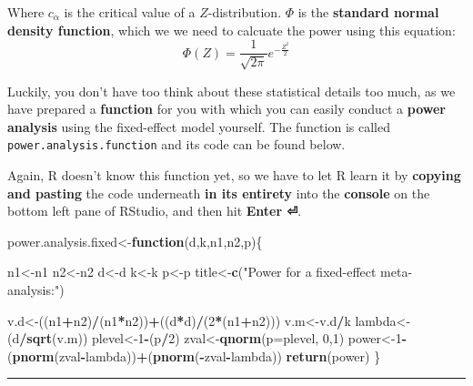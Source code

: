 \documentclass[]{book}
\newenvironment{Shaded}{\begin{snugshade}}{\end{snugshade}}
\newcommand{\ControlFlowTok}[1]{\textcolor[rgb]{0.13,0.29,0.53}{\textbf{#1}}}
\newcommand{\DataTypeTok}[1]{\textcolor[rgb]{0.13,0.29,0.53}{#1}}
\newcommand{\DecValTok}[1]{\textcolor[rgb]{0.00,0.00,0.81}{#1}}
\newcommand{\KeywordTok}[1]{\textcolor[rgb]{0.13,0.29,0.53}{\textbf{#1}}}
\newcommand{\NormalTok}[1]{#1}
\newcommand{\OperatorTok}[1]{\textcolor[rgb]{0.81,0.36,0.00}{\textbf{#1}}}
\newcommand{\StringTok}[1]{\textcolor[rgb]{0.31,0.60,0.02}{#1}}
\begin{document}
Where \(c_{\alpha}\) is the critical value of a \(Z\)-distribution. \(\Phi\) is the \textbf{standard normal density function}, which we we need to calcuate the power using this equation:
\[\Phi(Z)=\frac{1}{\sqrt {2\pi}}e^{-\frac{Z^2}{2}}\]

Luckily, you don't have too think about these statistical details too much, as we have prepared a \textbf{function} for you with which you can easily conduct a \textbf{power analysis} using the fixed-effect model yourself. The function is called \texttt{power.analysis.function} and its code can be found below.

Again, R doesn't know this function yet, so we have to let R learn it by \textbf{copying and pasting} the code underneath \textbf{in its entirety} into the \textbf{console} on the bottom left pane of RStudio, and then hit \textbf{Enter ⏎}.

\begin{Shaded}
\begin{Highlighting}[]
\NormalTok{power.analysis.fixed<-}\ControlFlowTok{function}\NormalTok{(d,k,n1,n2,p)\{}

\NormalTok{  n1<-n1}
\NormalTok{  n2<-n2}
\NormalTok{  d<-d}
\NormalTok{  k<-k}
\NormalTok{  p<-p}
\NormalTok{  title<-}\KeywordTok{c}\NormalTok{(}\StringTok{"Power for a fixed-effect meta-analysis:"}\NormalTok{)}

\NormalTok{  v.d<-((n1}\OperatorTok{+}\NormalTok{n2)}\OperatorTok{/}\NormalTok{(n1}\OperatorTok{*}\NormalTok{n2))}\OperatorTok{+}\NormalTok{((d}\OperatorTok{*}\NormalTok{d)}\OperatorTok{/}\NormalTok{(}\DecValTok{2}\OperatorTok{*}\NormalTok{(n1}\OperatorTok{+}\NormalTok{n2)))}
\NormalTok{  v.m<-v.d}\OperatorTok{/}\NormalTok{k}
\NormalTok{  lambda<-(d}\OperatorTok{/}\KeywordTok{sqrt}\NormalTok{(v.m))}
\NormalTok{  plevel<-}\DecValTok{1}\OperatorTok{-}\NormalTok{(p}\OperatorTok{/}\DecValTok{2}\NormalTok{)}
\NormalTok{  zval<-}\KeywordTok{qnorm}\NormalTok{(}\DataTypeTok{p=}\NormalTok{plevel, }\DecValTok{0}\NormalTok{,}\DecValTok{1}\NormalTok{)}
\NormalTok{  power<-}\DecValTok{1}\OperatorTok{-}\NormalTok{(}\KeywordTok{pnorm}\NormalTok{(zval}\OperatorTok{-}\NormalTok{lambda))}\OperatorTok{+}\NormalTok{(}\KeywordTok{pnorm}\NormalTok{(}\OperatorTok{-}\NormalTok{zval}\OperatorTok{-}\NormalTok{lambda))}
  \KeywordTok{return}\NormalTok{(power)}
\NormalTok{\}}
\end{Highlighting}
\end{Shaded}

\begin{center}\rule{0.5\linewidth}{\linethickness}\end{center}
\end{document}
